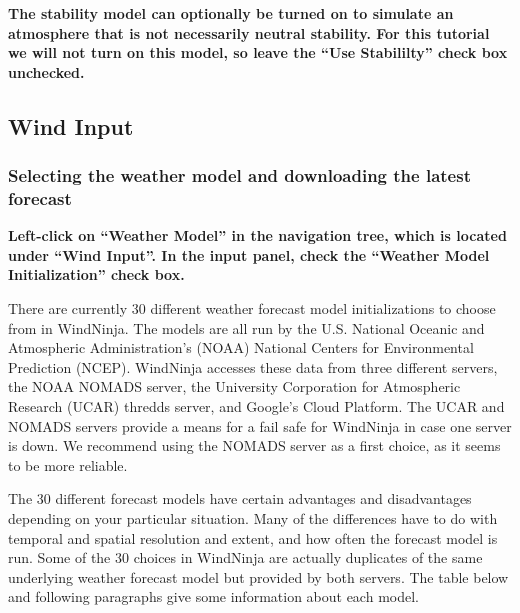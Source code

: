 \documentclass[12pt]{article}
\begin{document}
\textbf{\color{red} The stability model can optionally be turned on to simulate an atmosphere that is not necessarily neutral stability.  For this tutorial we will not turn on this model, so leave the “Use Stabililty” check box unchecked.}

\subsection{Wind Input}

\subsubsection{Selecting the weather model and downloading the latest forecast}

\textbf{\color{red} Left-click on “Weather Model” in the navigation tree, which is located under  “Wind Input”.  In the input panel, check the “Weather Model Initialization” check box.}

There are currently 30 different weather forecast model initializations to choose from in WindNinja.  The models are all run by the U.S. National Oceanic and Atmospheric Administration's (NOAA) National Centers for Environmental Prediction (NCEP).  WindNinja accesses these data from three different servers, the NOAA NOMADS server, the University Corporation for Atmospheric Research (UCAR) thredds server, and Google's Cloud Platform.  The UCAR and NOMADS servers provide a means for a fail safe for WindNinja in case one server is down.  We recommend using the NOMADS server as a first choice, as it seems to be more reliable.

The 30 different forecast models have certain advantages and disadvantages depending on your particular situation.  Many of the differences have to do with temporal and spatial resolution and extent, and how often the forecast model is run.  Some of the 30 choices in WindNinja are actually duplicates of the same underlying weather forecast model but provided by both servers.  The table below and following paragraphs give some information about each model.
\end{document}

